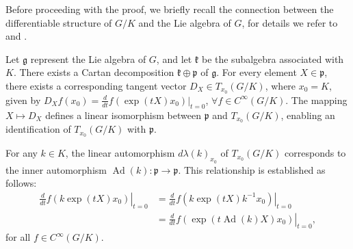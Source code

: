 \documentclass[12pt]{amsart}
\theoremstyle{definition}
\begin{document}
Before proceeding with the proof, we briefly recall the connection
between the differentiable structure of \(G/K\) and the Lie algebra of
\(G\), for details we refer to \cite[Chapter~III,~7]{Helgason2001} and
\cite[Chapter~V,~6]{Helgason2001}.

Let \(\mathfrak{g}\) represent the Lie algebra of \(G\), and let
\(\mathfrak{k}\) be the subalgebra associated with \(K\). There exists a
Cartan decomposition \(\mathfrak{k} \oplus \mathfrak{p}\) of
\(\mathfrak{g}\). For every element \(X \in \mathfrak{p}\), there exists
a corresponding tangent vector \(D_X \in T_{x_0}(G / K)\), where
\(x_0 = K\), given by
\(D_X f(x_0) = \frac{d}{dt} f(\exp(tX) x_0)|_{t=0}\),
\(\forall f \in C^{\infty}(G / K)\). The mapping \(X \mapsto D_X\)
defines a linear isomorphism between \(\mathfrak{p}\) and
\(T_{x_0}(G / K)\), enabling an identification of \(T_{x_0}(G / K)\)
with \(\mathfrak{p}\).

For any \(k \in K\), the linear automorphism \(d\lambda(k)_{x_0}\) of
\(T_{x_0}(G / K)\) corresponds to the inner automorphism
\(\operatorname{Ad}(k): \mathfrak{p} \to \mathfrak{p}\). This
relationship is established as follows: \[
\begin{aligned}
\left.\frac{d}{dt} f\left(k \exp(tX) x_0\right)\right|_{t=0} 
& = \left.\frac{d}{dt} f\left(k \exp(tX) k^{-1} x_0\right)\right|_{t=0} \\
& = \left.\frac{d}{dt} f\left(\exp\left(t \operatorname{Ad}(k)X\right) x_0\right)\right|_{t=0},
\end{aligned}
\] for all \(f \in C^{\infty}(G / K)\).
\end{document}
